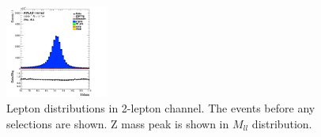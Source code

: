 \begin{figure}[ht]
    \centering
    \includegraphics[width=0.3\textwidth]{figures/2lep/dataMC/C_0ptag1pfat0pjet_0ptv_ALL_llMass_Lin.png}
    \caption{Lepton distributions in 2-lepton channel. The events before any selections are shown. Z mass peak is shown in $M_{ll}$ distribution.}
    \label{fig:2lepLeptons}
\end{figure}


\begin{table}[h]
  \caption{List of the \textbf{pre-selections applied in the CxAOD framework} to reduce the data size.
Definitions of Tight and Loose leptons are found in Sections~\ref{subsec:electron_selection}--\ref{subsec:muon_selection}.
$N_j$ is the number of signal- and VBF-jets defined in Section~\ref{subsec:jet_selection}.
$N_J^{\textrm{LCTopo}}$ is the number of large-R jets with $\pt>200\,\GeV$ and $\left| \eta \right| < 2.5$.
} \label{tab:presel_CxAOD}

\begin{center}
\end{center}
\end{table}




